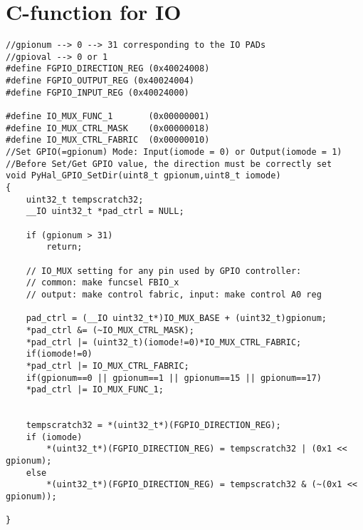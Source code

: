 \documentclass[journal,10pt]{article}
\begin{document}
\section{\large C-function for IO}
\begin{verbatim}
//gpionum --> 0 --> 31 corresponding to the IO PADs
//gpioval --> 0 or 1
#define FGPIO_DIRECTION_REG (0x40024008)
#define FGPIO_OUTPUT_REG (0x40024004)
#define FGPIO_INPUT_REG (0x40024000)

#define IO_MUX_FUNC_1 		(0x00000001)
#define IO_MUX_CTRL_MASK 	(0x00000018)
#define IO_MUX_CTRL_FABRIC 	(0x00000010)
//Set GPIO(=gpionum) Mode: Input(iomode = 0) or Output(iomode = 1)
//Before Set/Get GPIO value, the direction must be correctly set
void PyHal_GPIO_SetDir(uint8_t gpionum,uint8_t iomode)
{
    uint32_t tempscratch32;
    __IO uint32_t *pad_ctrl = NULL;

    if (gpionum > 31)
        return;

    // IO_MUX setting for any pin used by GPIO controller:
    // common: make funcsel FBIO_x
    // output: make control fabric, input: make control A0 reg

    pad_ctrl = (__IO uint32_t*)IO_MUX_BASE + (uint32_t)gpionum;
    *pad_ctrl &= (~IO_MUX_CTRL_MASK);
    *pad_ctrl |= (uint32_t)(iomode!=0)*IO_MUX_CTRL_FABRIC;
    if(iomode!=0)
	*pad_ctrl |= IO_MUX_CTRL_FABRIC;
    if(gpionum==0 || gpionum==1 || gpionum==15 || gpionum==17) 
	*pad_ctrl |= IO_MUX_FUNC_1;
    

    tempscratch32 = *(uint32_t*)(FGPIO_DIRECTION_REG);
    if (iomode)
        *(uint32_t*)(FGPIO_DIRECTION_REG) = tempscratch32 | (0x1 << gpionum);
    else
        *(uint32_t*)(FGPIO_DIRECTION_REG) = tempscratch32 & (~(0x1 << gpionum));

}
\end{verbatim}
\end{document}
